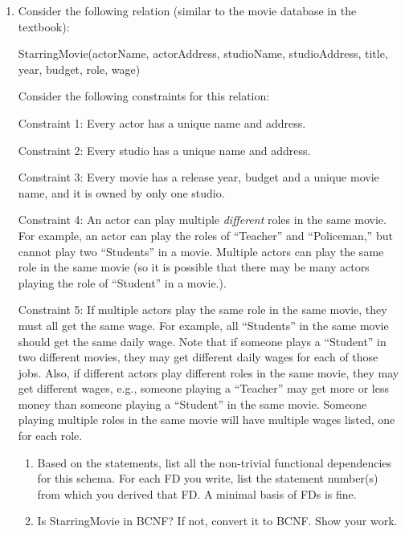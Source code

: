 \documentclass[11pt]{article}
\begin{document}
\begin{enumerate}
	\item Consider the following relation (similar to the movie database in the textbook):

StarringMovie(actorName, actorAddress, studioName, studioAddress, title, year, budget, role, wage)

Consider the following constraints for this relation: 

Constraint 1:	Every actor has a unique name and address. 

Constraint 2:	Every studio has a unique name and  address. 

Constraint 3:	Every movie has a release year, budget and a unique movie name, and it is owned by only one studio. 

Constraint 4:	An actor can play multiple \emph{different} roles in the same movie. For example, an actor can play the roles of ``Teacher'' and ``Policeman,'' but cannot play two ``Students'' in a movie.  Multiple actors can play the same role in the same movie (so it is possible that there may be many actors playing the role of ``Student'' in a movie.). 

Constraint 5:	If multiple actors play the same role in the same movie, they must all get the same wage. For example, all ``Students'' in the same movie should get the same daily wage.  Note that if someone plays a ``Student'' in two different movies, they may get different daily wages for each of those jobs. Also, if different actors play different roles in the same movie, they may get different wages, e.g., someone playing a ``Teacher'' may get more or less money than someone playing a ``Student'' in the same movie.  Someone
playing multiple roles in the same movie will have multiple wages listed, one for each role.

\begin{enumerate}
\item Based on the statements, list all the non-trivial functional dependencies for this schema.  For each FD you write, list the statement number(s) from which you derived that FD.
A minimal basis of FDs is fine.


\item Is StarringMovie in BCNF?  If not, convert it to BCNF.  Show your work.
\end{enumerate}

\end{enumerate}
\end{document}
